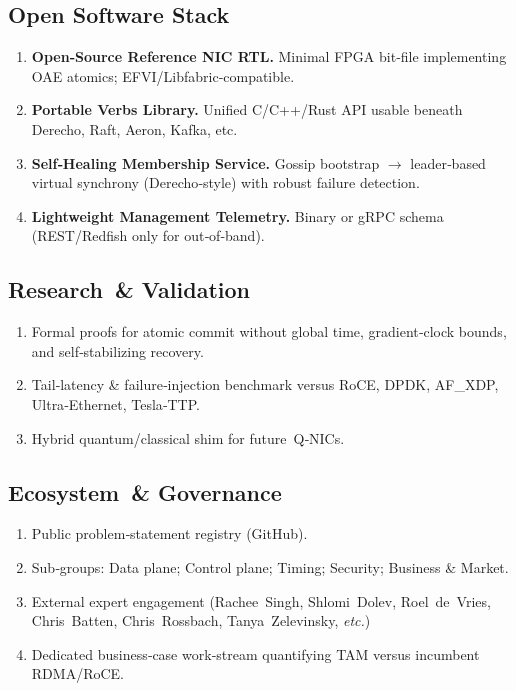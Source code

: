\subsection{Open Software Stack}
\begin{enumerate}
\item \textbf{Open‑Source Reference NIC RTL.} Minimal FPGA bit‑file implementing OAE atomics; EFVI/Libfabric‑compatible.
\item \textbf{Portable Verbs Library.} Unified C/C++/Rust API usable beneath Derecho, Raft, Aeron, Kafka, etc.
\item \textbf{Self‑Healing Membership Service.} Gossip bootstrap $\rightarrow$ leader‑based virtual synchrony (Derecho‑style) with robust failure detection.
\item \textbf{Lightweight Management Telemetry.} Binary or gRPC schema (REST/Redfish only for out‑of‑band).
\end{enumerate}

\subsection{Research \& Validation}
\begin{enumerate}
\item Formal proofs for atomic commit without global time, gradient‑clock bounds, and self‑stabilizing recovery.
\item Tail‑latency \& failure‑injection benchmark versus RoCE, DPDK, AF\_XDP, Ultra‑Ethernet, Tesla‑TTP.
\item Hybrid quantum/classical shim for future Q‑NICs.
\end{enumerate}

\subsection{Ecosystem \& Governance}
\begin{enumerate}
\item Public problem‑statement registry (GitHub).
\item Sub‑groups: Data plane; Control plane; Timing; Security; Business \& Market.
\item External expert engagement (Rachee Singh, Shlomi Dolev, Roel de Vries, Chris Batten, Chris Rossbach, Tanya Zelevinsky, \textit{etc.})
\item Dedicated business‑case work‑stream quantifying TAM versus incumbent RDMA/RoCE.
\end{enumerate}

